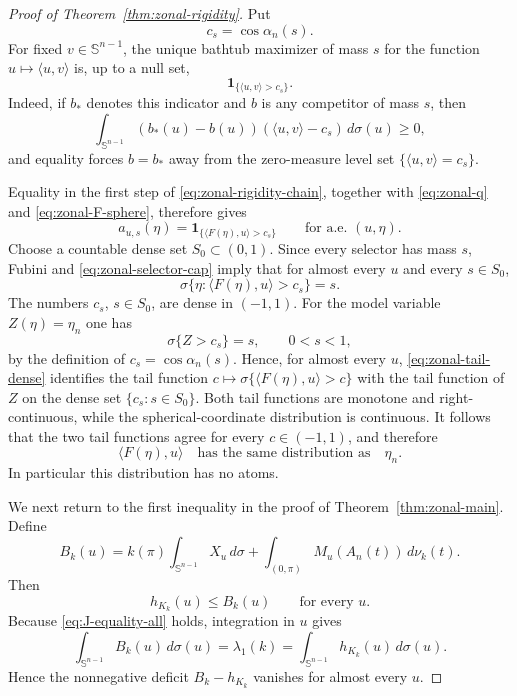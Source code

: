 \documentclass[11pt,reqno]{amsart}
\theoremstyle{remark}
\begin{document}
\begin{proof}[Proof of Theorem~\ref{thm:zonal-rigidity}]
Put
\[
 c_s=\cos\alpha_n(s).
\]
For fixed $v\in\mathbb S^{n-1}$, the unique bathtub maximizer of mass $s$
for the function $u\mapsto\langle u,v\rangle$ is, up to a null set,
\[
 \mathbf1_{\{\langle u,v\rangle>c_s\}}.
\]
Indeed, if $b_*$ denotes this indicator and $b$ is any competitor of mass
$s$, then
\[
 \int_{\mathbb S^{n-1}}(b_*(u)-b(u))(\langle u,v\rangle-c_s)\,d\sigma(u)\ge0,
\]
and equality forces $b=b_*$ away from the zero-measure level set
$\{\langle u,v\rangle=c_s\}$.

Equality in the first step of \eqref{eq:zonal-rigidity-chain}, together
with \eqref{eq:zonal-q} and \eqref{eq:zonal-F-sphere}, therefore gives
\begin{equation}\label{eq:zonal-selector-cap}
 a_{u,s}(\eta)
 =
 \mathbf1_{\{\langle F(\eta),u\rangle>c_s\}}
 \qquad\text{for a.e. }(u,\eta).
\end{equation}
Choose a countable dense set $S_0\subset(0,1)$.  Since every selector has
mass $s$, Fubini and \eqref{eq:zonal-selector-cap} imply that for almost
every $u$ and every $s\in S_0$,
\begin{equation}\label{eq:zonal-tail-dense}
 \sigma\{
 \eta:\langle F(\eta),u\rangle>c_s
 \}
 =
 s.
\end{equation}
The numbers $c_s$, $s\in S_0$, are dense in $(-1,1)$.  For the model
variable $Z(\eta)=\eta_n$ one has
\[
 \sigma\{Z>c_s\}=s,
 \qquad 0<s<1,
\]
by the definition of $c_s=\cos\alpha_n(s)$.  Hence, for almost every $u$,
\eqref{eq:zonal-tail-dense} identifies the tail function
$c\mapsto\sigma\{\langle F(\eta),u\rangle>c\}$ with the tail function of
$Z$ on the dense set $\{c_s:s\in S_0\}$.  Both tail functions are monotone
and right-continuous, while the spherical-coordinate distribution is
continuous.  It follows that the two tail functions agree for every
$c\in(-1,1)$, and therefore
\begin{equation}\label{eq:zonal-projection-law}
 \langle F(\eta),u\rangle
 \quad\text{has the same distribution as}\quad
 \eta_n.
\end{equation}
In particular this distribution has no atoms.

We next return to the first inequality in the proof of
Theorem~\ref{thm:zonal-main}.  Define
\[
 B_k(u)
 =
 k(\pi)\int_{\mathbb S^{n-1}}X_u\,d\sigma
 +
 \int_{(0,\pi)}M_u(A_n(t))\,d\nu_k(t).
\]
Then
\[
 h_{K_k}(u)\le B_k(u)
 \qquad\text{for every }u.
\]
Because \eqref{eq:J-equality-all} holds, integration in $u$ gives
\[
 \int_{\mathbb S^{n-1}}B_k(u)\,d\sigma(u)
 =
 \lambda_1(k)
 =
 \int_{\mathbb S^{n-1}}h_{K_k}(u)\,d\sigma(u).
\]
Hence the nonnegative deficit $B_k-h_{K_k}$ vanishes for almost every
$u$.


\end{proof}
\end{document}
